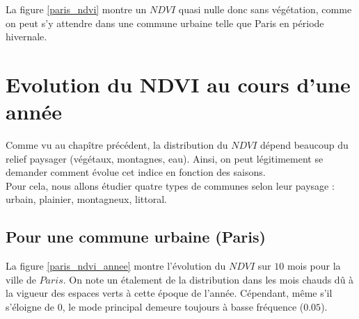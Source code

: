 \documentclass{book}
\begin{document}
La figure \ref{paris_ndvi} montre un $NDVI$ quasi nulle donc sans végétation, comme on peut s'y attendre dans une commune urbaine telle que Paris en période hivernale.\\

\clearpage


\chapter{Evolution du NDVI au cours d'une année}

Comme vu au chapître précédent, la distribution du $NDVI$ dépend beaucoup du relief paysager (végétaux, montagnes, eau).
Ainsi, on peut légitimement se demander comment évolue cet indice en fonction des saisons.\\
Pour cela, nous allons étudier quatre types de communes selon leur paysage : urbain, plainier, montagneux, littoral.\\

\section{Pour une commune urbaine (Paris)}

La figure \ref{paris_ndvi_annee} montre l'évolution du $NDVI$ sur $10$ mois pour la ville de $Paris$. On note un étalement de la distribution 
dans les mois chauds d\^u à la vigueur des espaces verts à cette époque de l'année. Cépendant, même s'il s'éloigne de 0, le mode principal 
demeure toujours à basse fréquence ($0.05$).
\end{document}
